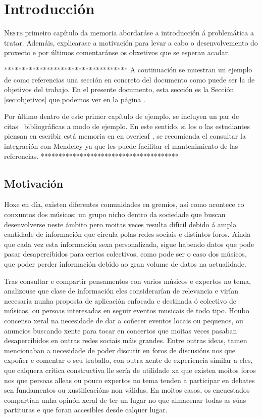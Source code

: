 \chapter{Introducción}
\label{chap:introduccion}

\lettrine{N}{este} primeiro capítulo da memoria abordaráse a introducción á problemática a tratar. Ademáis, explicarase a motivación para levar a cabo o desenvolvemento do proxecto e por últimos comentaránse os obxetivos que se esperan acadar.

***********************************
A continuación se muestran un ejemplo de como referencias una sección 
en concreto del documento como puede ser la de objetivos del trabajo. 
En el presente documento, esta sección es la Sección \ref{sec:objetivos}
que podemos ver en la página \pageref{sec:objetivos}.

Por último dentro de este primer capítulo de ejemplo, se incluyen un 
par de citas~\cite{RAE,RAGA, van2005student} bibliográficas a modo 
de ejemplo. En este sentido, si los o las estudiantes piensan en 
escribir está memoria en en overleaf \cite{Overleaf}, se recomienda el 
consultar la integración con Mendeley \cite{Mendeley} ya que les puede 
facilitar el mantenimiento de las referencias.
***************************************

\section{Motivación}

Hoxe en día, existen diferentes comunidades en gremios, así como acontece co conxuntos dos músicos: un grupo nicho dentro da sociedade que buscan desenvolverse neste ámbito pero moitas veces resulta difícil debido á ampla cantidade de información que circula polas redes sociais e distintos foros. Aínda que cada vez esta información sexa personalizada, sigue habendo datos que pode pasar desapercibidos para certos colectivos, como pode ser o caso dos músicos, que poder perder información debido ao gran volume de datos na actualidade.

Tras consultar e compartir pensamentos con varios músicos e expertos no tema, analizouse que clase de información eles considerarían de relevancia e virían necesaria nunha proposta de aplicación enfocada e destinada ó colectivo de músicos, ou persoas interesadas en seguir eventos  musicais de todo tipo. Houbo concenso xeral na necesidade de dar a coñecer eventos locais ou pequenos, ou anuncios buscando xente para tocar en concertos que moitas veces pasaban desapercibidos en outras redes sociais máis grandes. Entre outras ideas, tamen mencionaban a necesidade de poder discutir en foros de discusións nos que expoñer e comentar o seu traballo, con outra xente de experiencia similar a eles, que calquera crítica constructiva lle sería de utilidade xa que existen moitos foros nos que persoas alleas ou pouco expertos no tema tenden a participar en debates sen fundamentos ou xustificacións non válidas.
En moitos casos, os encuestados compartían unha opinón xeral de ter un lugar no que almacenar todas as súas partituras e que foran accesibles desde calquer lugar. 

